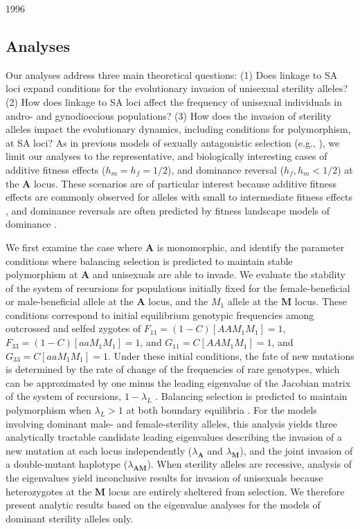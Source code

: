 1996\documentclass[9pt,twocolumn,twoside,lineno]{gsajnl}
\begin{document}
\subsection{Analyses} \label{subsec:analyses}

Our analyses address three main theoretical questions: (1) Does linkage to SA loci expand conditions for the evolutionary invasion of unisexual sterility alleles? (2) How does linkage to SA loci affect the frequency of unisexual individuals in andro- and gynodioecious populations? (3) How does the invasion of sterility alleles impact the evolutionary dynamics, including conditions for polymorphism, at SA loci? As in previous models of sexually antagonistic selection (e.g., \citealp{Kidwell1977,Prout2000,JordanConnallon2014}), we limit our analyses to the representative, and biologically interesting cases of additive fitness effects ($h_m = h_f = 1/2$), and dominance reversal ($h_f,h_m < 1/2$) at the $\mathbf{A}$ locus. These scenarios are of particular interest because additive fitness effects are commonly observed for alleles with small to intermediate fitness effects \citep{AgrawalWhitlock2011}, and dominance reversals are often predicted by fitness landscape models of dominance \citep{Manna2011, ConnallonClark2014}.

We first examine the case where $\mathbf{A}$ is monomorphic, and identify the parameter conditions where balancing selection is predicted to maintain stable polymorphism at $\mathbf{A}$ and unisexuals are able to invade. We evaluate the stability of the system of recursions for populations initially fixed for the female-beneficial or male-beneficial allele at the $\mathbf{A}$ locus, and the $M_1$ allele at the $\mathbf{M}$ locus. These conditions correspond to initial equilibrium genotypic frequencies among outcrossed and selfed zygotes of $F_{11} = (1 - C) [AAM_1M_1] = 1$, $F_{33} = (1 - C) [aaM_1M_1] = 1$, and $G_{11} = C [AAM_1M_1] = 1$, and $G_{33} = C [aaM_1M_1] = 1$. Under these initial conditions, the fate of new mutations is determined by the rate of change of the frequencies of rare genotypes, which can be approximated by one minus the leading eigenvalue of the Jacobian matrix of the system of recursions, $1 - \lambda_L$ \citep{OttoDay2007}. Balancing selection is predicted to maintain polymorphism when $\lambda_L > 1$ at both boundary equilibria \citep{Prout1968,OttoDay2007}. For the models involving dominant male- and female-sterility alleles, this analysis yields three analytically tractable candidate leading eigenvalues describing the invasion of a new mutation at each locus independently ($\lambda_\mathbf{A}$ and $\lambda_\mathbf{M}$), and the joint invasion of a double-mutant haplotype ($\lambda_\mathbf{AM}$). When sterility alleles are recessive, analysis of the eigenvalues yield inconclusive results for invasion of unisexuals because heterozygotes at the $\mathbf{M}$ locus are entirely sheltered from selection. We therefore present analytic results based on the eigenvalue analyses for the models of dominant sterility alleles only.
\end{document}

